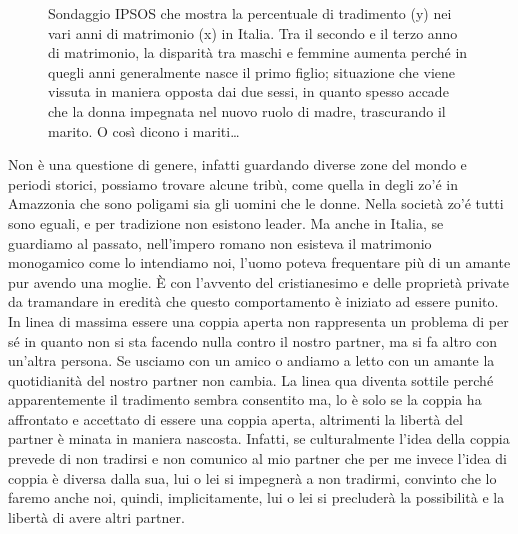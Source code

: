 \documentclass[12pt]{book} %
\begin{document}
\needspace{4cm}
\begin{figure}[H]
  \centering
  \caption{Sondaggio IPSOS che mostra la percentuale di tradimento (y) nei vari anni di matrimonio (x) in Italia. Tra il secondo e il terzo anno di matrimonio, la disparità tra maschi e femmine aumenta perché in quegli anni generalmente nasce il primo figlio; situazione che viene vissuta in maniera opposta dai due sessi, in quanto spesso accade che la donna impegnata nel nuovo ruolo di madre, trascurando il marito. O così dicono i mariti…}
\end{figure}

Non è una questione di genere, infatti guardando diverse zone del mondo e periodi storici, possiamo trovare alcune
tribù, come quella in degli zo'é in Amazzonia che sono poligami sia gli uomini che le donne. Nella
società zo'é tutti sono eguali, e per tradizione non esistono leader. Ma anche in Italia, se
guardiamo al passato, nell'impero romano non esisteva il matrimonio monogamico come lo intendiamo noi, l'uomo poteva
frequentare più di un amante pur avendo una moglie. È con l'avvento del cristianesimo e delle
proprietà private da tramandare in eredità che questo comportamento è iniziato ad essere punito. In linea di massima
essere una coppia aperta non rappresenta un problema di per sé in quanto non si sta facendo nulla contro il nostro
partner, ma si fa altro con un'altra persona. Se usciamo con un amico o andiamo a letto
con un amante la quotidianità del nostro partner non cambia. La linea qua diventa sottile perché apparentemente il
tradimento sembra consentito ma, lo è solo se la coppia ha affrontato e accettato di essere una coppia aperta,
altrimenti la libertà del partner è minata in maniera nascosta. Infatti, se culturalmente l'idea
della coppia prevede di non tradirsi e non comunico al mio partner che per me invece l'idea di
coppia è diversa dalla sua, lui o lei si impegnerà a non tradirmi, convinto che lo faremo anche noi, quindi,
implicitamente, lui o lei si precluderà la possibilità e la libertà di avere altri partner.
\end{document}
